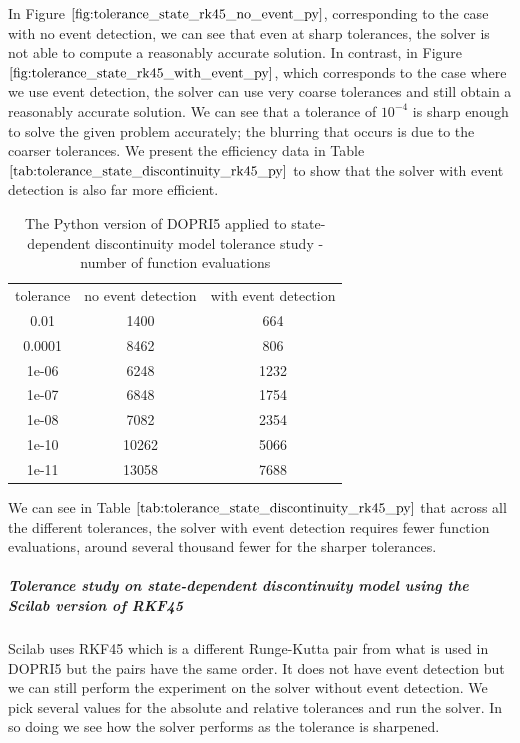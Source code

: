 In Figure $\ref{fig:tolerance_state_rk45_no_event_py}$, corresponding to the case with no event detection, we can see that even at sharp tolerances, the solver is not able to compute a reasonably accurate solution. In contrast, in Figure $\ref{fig:tolerance_state_rk45_with_event_py}$, which corresponds to the case where we use event detection, the solver can use very coarse tolerances and still obtain a reasonably accurate solution. We can see that a tolerance of $10^{-4}$ is sharp enough to solve the given problem accurately; the blurring that occurs is due to the coarser tolerances. We present the efficiency data in Table $\ref{tab:tolerance_state_discontinuity_rk45_py}$ to show that the solver with event detection is also far more efficient.

\begin{table}[h]
\caption {The Python version of DOPRI5 applied to state-dependent discontinuity model tolerance study - number of function evaluations} \label{tab:tolerance_state_discontinuity_rk45_py} 
\begin{center}
\begin{tabular}{ c c c }
tolerance & no event detection & with event detection \\
0.01 & 1400 & 664  \\
0.0001 & 8462  & 806  \\
1e-06 & 6248  & 1232  \\
1e-07 & 6848  & 1754  \\
1e-08 & 7082  & 2354  \\
1e-10 & 10262  & 5066  \\
1e-11 & 13058  & 7688  \\
\end{tabular}
\end{center}
\end{table}

We can see in Table $\ref{tab:tolerance_state_discontinuity_rk45_py}$ that across all the different tolerances, the solver with event detection requires fewer function evaluations, around several thousand fewer for the sharper tolerances. 

\subparagraph{Tolerance study on state-dependent discontinuity model using the Scilab version of RKF45}
Scilab uses RKF45 which is a different Runge-Kutta pair from what is used in DOPRI5 but the pairs have the same order. It does not have event detection but we can still perform the experiment on the solver without event detection. We pick several values for the absolute and relative tolerances and run the solver. In so doing we see how the solver performs as the tolerance is sharpened. 

